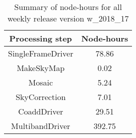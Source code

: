 \begin{table}[h]
  \centering
  \begin{tabular} {|c|c|}
    \hline
    Processing step & Node-hours \\
    \hline
    SingleFrameDriver &  78.86 \\ 
    MakeSkyMap        &   0.02 \\
    Mosaic            &   5.24 \\
    SkyCorrection     &   7.01 \\
    CoaddDriver       &  29.51 \\
    MultibandDriver   & 392.75 \\
    \hline
  \end{tabular}
  \caption{Summary of node-hours for all weekly release version w\_2018\_17}
  \label{tbl:PerTask17}
\end{table}
